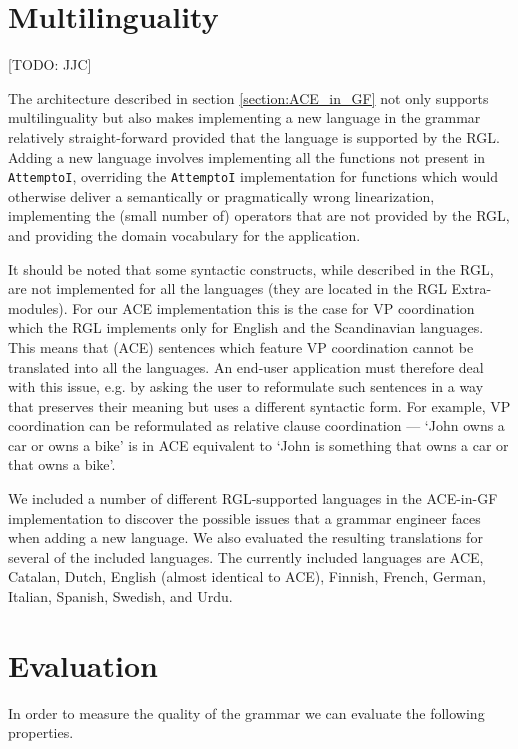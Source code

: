 \documentclass[a4paper]{article}
\begin{document}
\section{Multilinguality}
\label{section:Multilinguality}

[TODO: JJC]

The architecture described in section \ref{section:ACE_in_GF} not only supports
multilinguality but also makes implementing a new language in the grammar
relatively straight-forward provided that the language
is supported by the RGL. Adding a new language involves
implementing all the functions not present in \texttt{AttemptoI},
overriding the \texttt{AttemptoI} implementation for functions which would
otherwise deliver a semantically or pragmatically wrong linearization,
implementing the (small number of) operators that are not provided by the RGL,
and providing the domain vocabulary for the application.

It should be noted that some syntactic constructs, while described in the RGL,
are not implemented for all the languages (they are located in the RGL
Extra-modules). For our ACE implementation this is the case for VP coordination
which the RGL implements only for English and the Scandinavian languages.
This means that (ACE) sentences which feature VP coordination cannot be
translated into all the languages. An end-user application must therefore deal
with this issue, e.g. by asking the user to reformulate such sentences in a way
that preserves their meaning but uses a different syntactic form. For example,
VP coordination can be reformulated as relative clause coordination ---
`John owns a car or owns a bike' is in ACE equivalent to
`John is something that owns a car or that owns a bike'.

We included a number of different RGL-supported languages in the ACE-in-GF
implementation to discover the possible issues that a grammar engineer faces
when adding a new language. We also evaluated the resulting
translations for several of the included languages.
The currently included languages are
ACE,
Catalan,
Dutch,
English (almost identical to ACE),
Finnish,
French,
German,
Italian,
Spanish,
Swedish, and
Urdu.


\section{Evaluation}
\label{section:Evaluation}

In order to measure the quality of the grammar we can evaluate the following
properties.
\end{document}
